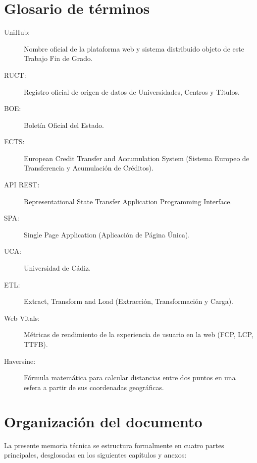 \section{Glosario de términos} 
\begin{description}
    \item[UniHub:] Nombre oficial de la plataforma web y sistema distribuido objeto de este Trabajo Fin de Grado.
    \item[RUCT:] Registro oficial de origen de datos de Universidades, Centros y Títulos.
    \item[BOE:] Boletín Oficial del Estado.
    \item[ECTS:] European Credit Transfer and Accumulation System (Sistema Europeo de Transferencia y Acumulación de Créditos).
    \item[API REST:] Representational State Transfer Application Programming Interface.
    \item[SPA:] Single Page Application (Aplicación de Página Única).
    \item[UCA:] Universidad de Cádiz.
    \item[ETL:] Extract, Transform and Load (Extracción, Transformación y Carga).
    \item[Web Vitals:] Métricas de rendimiento de la experiencia de usuario en la web (FCP, LCP, TTFB).
    \item[Haversine:] Fórmula matemática para calcular distancias entre dos puntos en una esfera a partir de sus coordenadas geográficas.
\end{description}

\section{Organización del documento}
La presente memoria técnica se estructura formalmente en cuatro partes principales, desglosadas en los siguientes capítulos y anexos:


